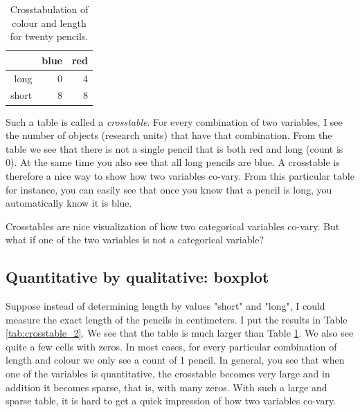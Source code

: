 \documentclass[]{report}\usepackage[]{graphicx}\usepackage[]{color}
\begin{document}
\begin{table}[ht]
\centering
\caption{Crosstabulation of colour and length for twenty pencils.} 
\label{tab:crosstable_1}
\begin{tabular}{rrr}
  \hline
 & blue & red \\ 
  \hline
long & 0 & 4 \\ 
  short & 8 & 8 \\ 
   \hline
\end{tabular}
\end{table}


Such a table is called a \textit{crosstable}. For every combination of two variables, I see the number of objects (research units) that have that combination. From the table we see that there is not a single pencil that is both red and long (count is 0). At the same time you also see that all long pencils are blue. A crosstable is therefore a nice way to show how two variables co-vary. From this particular table for instance, you can easily see that once you know that a pencil is long, you automatically know it is blue. 


Crosstables are nice visualization of how two categorical variables co-vary. But what if one of the two variables is not a categorical variable? 


\subsection{Quantitative by qualitative: boxplot}
Suppose instead of determining length by values "short" and "long", I could measure the exact length of the pencils in centimeters. I put the results in Table \ref{tab:crosstable_2}. We see that the table is much larger than Table \ref{tab:crosstable_1}. We also see quite a few cells with zeros. In most cases, for every particular combination of length and colour we only see a count of 1 pencil. In general, you see that when one of the variables is quantitative, the crosstable becomes very large and in addition it becomes sparse, that is, with many zeros. With such a large and sparse table, it is hard to get a quick impression of how two variables co-vary. 
\end{document}
